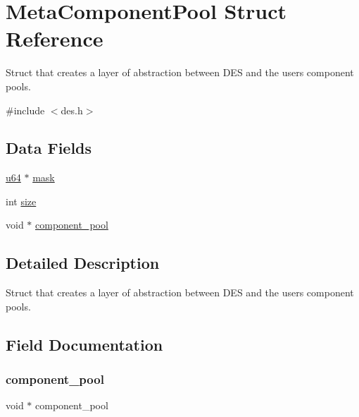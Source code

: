 \hypertarget{struct_meta_component_pool}{}\section{Meta\+Component\+Pool Struct Reference}
\label{struct_meta_component_pool}


Struct that creates a layer of abstraction between D\+ES and the user\textquotesingle{}s component pools.  




{\ttfamily \#include $<$des.\+h$>$}

\subsection*{Data Fields}
\begin{DoxyCompactItemize}
\item 
\mbox{\hyperlink{examples_2velocity_2include_2des__internal_8h_a3f7e2bcbb0b4c338f3c4f6c937cd4234}{u64}} $\ast$ \mbox{\hyperlink{struct_meta_component_pool_a98ab08080a9542a53fd11e192635d257}{mask}}
\item 
int \mbox{\hyperlink{struct_meta_component_pool_a439227feff9d7f55384e8780cfc2eb82}{size}}
\item 
void $\ast$ \mbox{\hyperlink{struct_meta_component_pool_a4123ddd64e6fbc27404edc2084ea0a7e}{component\+\_\+pool}}
\end{DoxyCompactItemize}


\subsection{Detailed Description}
Struct that creates a layer of abstraction between D\+ES and the user\textquotesingle{}s component pools. 

\subsection{Field Documentation}
\mbox{\label{struct_meta_component_pool_a4123ddd64e6fbc27404edc2084ea0a7e}} 
\subsubsection{\texorpdfstring{component\+\_\+pool}{component\_pool}}
{\footnotesize\ttfamily void $\ast$ component\+\_\+pool}

